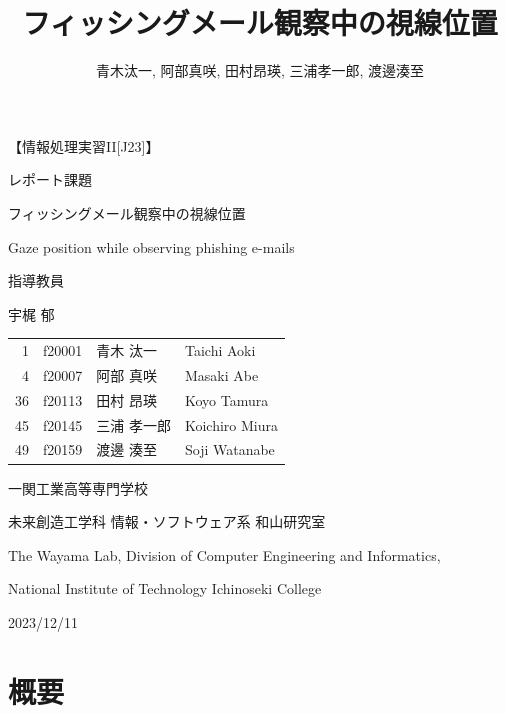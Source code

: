 \documentclass[a4paper,11pt]{ltjsreport}
\title{フィッシングメール観察中の視線位置}
\author{青木汰一, 阿部真咲, 田村昂瑛, 三浦孝一郎, 渡邊湊至}
\begin{document}
\begin{titlepage}
	\begin{center}
		{\Large 【情報処理実習II[J23]】}
		\vspace{5truept}

		{\LARGE レポート課題}
		\vspace*{70truept}

		{\Huge フィッシングメール観察中の視線位置}
		\vspace{10truept}

		{\LARGE Gaze position while observing phishing e-mails}
		\vspace{40truept}

		{\large 指導教員}
		\vspace{5truept}

		{\Large 宇梶 郁}
		\vspace{120truept}

		\begin{table}[H]
			\centering
			\Large
			\begin{tabular}{rcll}
				1  & f20001 & 青木 汰一  & Taichi Aoki    \\
				4  & f20007 & 阿部 真咲  & Masaki Abe     \\
				36 & f20113 & 田村 昂瑛  & Koyo Tamura    \\
				45 & f20145 & 三浦 孝一郎 & Koichiro Miura \\
				49 & f20159 & 渡邊 湊至  & Soji Watanabe
			\end{tabular}
		\end{table}
		\vspace{50truept}

		{\Large 一関工業高等専門学校}

		{\Large 未来創造工学科 情報・ソフトウェア系 和山研究室}
		\vspace{10truept}

		{\large The Wayama Lab, Division of Computer Engineering and Informatics,

			National Institute of Technology Ichinoseki College}
		\vspace{40truept}


		{\Large 2023/12/11}
	\end{center}
\end{titlepage}

\tableofcontents
\clearpage

\chapter{概要}
\end{document}
